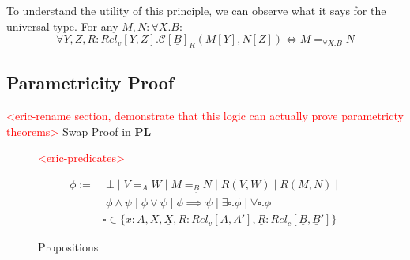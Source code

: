 \documentclass[acmsmall]{acmart}
\newcommand{\eric}[1]{\textcolor{red}{ <eric-#1> }}
\newcommand{\pl}{$\mathbf{PL}$}
\begin{document}
To understand the utility of this principle, we can observe what it says for the universal type. For any $M,N : \forall X.\underline{B}$:
\[
  \forall Y,Z,R:Rel_v[Y,Z].\mathcal{C}[\underline{B}]_R(M[Y],N[Z]) \iff M =_{\forall X. \underline{B}} N
\]


\subsection{Parametricity Proof}
\eric{rename section, demonstrate that this logic can actually prove parametricty theorems}
Swap Proof in \pl

\begin{figure}[h]
  \centering
  \eric{predicates}

  \begin{align*}
    \phi :=&\; \bot\;|\;V=_{A}W \;|\; M=_{\underline{B}}N \;|\; R(V,W) \;|\; \underline{R}(M,N) \;|\; 
    \\
    &\; \phi \land \psi \;|\; \phi \lor \psi \;|\; \phi \implies \psi \;|\; \exists \square.\phi \;|\; \forall \square .\phi \\ 
    & \square \in \{x:A,X,\underline{X},R:Rel_v[A,A'],\underline{R}:Rel_c[\underline{B},\underline{B}']\}
    \end{align*}
  \caption{Propositions}
  \label{fig:Props}
\end{figure}
\end{document}

